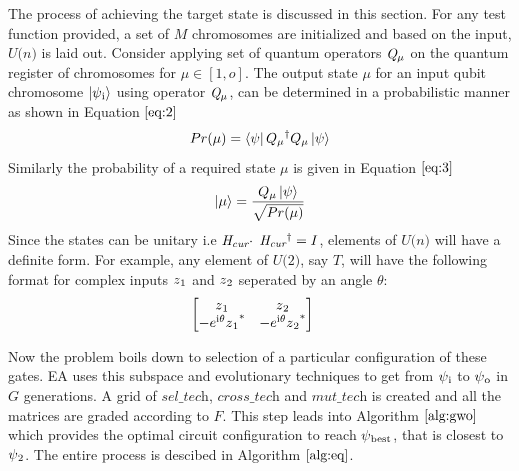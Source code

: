 \documentclass[conference]{IEEEtran}
\begin{document}
The process of achieving the target state is discussed in this section. For any test function provided, a set of $\textit{M}$ chromosomes are initialized and based on the input, $\textit{U(n)}$ is laid out. Consider applying set of quantum operators $\textit{Q\textsubscript{$\mu$}}$ on the quantum register of chromosomes for $\mu \in [1,o]$. The output state $\mu$ for an input qubit chromosome $\ket{\psi\textsubscript{i}}$ using operator $\textit{Q\textsubscript{$\mu$}}$, can be determined in a probabilistic manner as shown in Equation $\ref{eq:2}$
{\scriptsize
\begin{equation}
\label{eq:2}
Pr(\mu) = \bra{\psi} Q\textsubscript{$\mu$}\textsuperscript{$\dagger$}Q\textsubscript{$\mu$}\ket{\psi}
\end{equation}
}%
Similarly the probability of a required state $\mu$ is given in Equation $\ref{eq:3}$
{\scriptsize
\begin{equation}
\label{eq:3}
\ket{\mu} = \frac{Q\textsubscript{$\mu$}\ket{\psi}}{\sqrt{Pr(\mu)}}
\end{equation}
}
Since the states can be unitary i.e $\textit{H\textsubscript{cur}} \cdot$ $\textit{H\textsubscript{cur}\textsuperscript{$\dagger$}} = I$, elements of $\textit{U(n)}$ will have a definite form. For example, any element of $\textit{U(2)}$, say $\textit{T}$, will have the following format for complex inputs $z\textsubscript{1}$ and $z\textsubscript{2}$ seperated by an angle $\theta$:
$$
\begin{bmatrix} 
{z\textsubscript{1}}&{z\textsubscript{2}}\\
{-e\textsuperscript{i$\theta$}z\textsubscript{1}\textsuperscript{*}}&{-e\textsuperscript{i$\theta$}z\textsubscript{2}\textsuperscript{*}}\\
\end{bmatrix}
\quad
$$

Now the problem boils down to selection of a particular configuration of these gates. EA uses this subspace and evolutionary techniques to get from  $\psi\textsubscript{i}$ to $\psi\textsubscript{o}$ in $\textit{G}$ generations. A grid of $\textit{sel\_tech}$, $\textit{cross\_tech}$ and $\textit{mut\_tech}$ is created and all the matrices are graded according to $\textit{F}$. This step leads into Algorithm $\ref{alg:gwo}$ which provides the optimal circuit configuration to reach $\psi\textsubscript{best}$, that is closest to $\psi\textsubscript{2}$. The entire process is descibed in Algorithm $\ref{alg:eq}$. 
\end{document}
